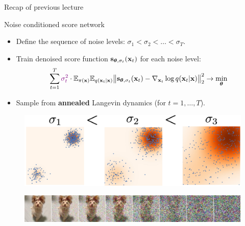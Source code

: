 \begin{frame}{Recap of previous lecture}
	\begin{block}{Noise conditioned score network}
		\begin{itemize}
			\item Define the sequence of noise levels: $\sigma_1 < \sigma_2 < \dots < \sigma_T$.
			\item Train denoised score function $\mathbf{s}_{\boldsymbol{\theta}, \sigma_t}(\mathbf{x}_t)$ for each noise level:
			\vspace{-0.3cm}
			\[
				\sum_{t=1}^T {\color{violet}\sigma_t^2} \cdot \mathbb{E}_{\pi(\mathbf{x})} \mathbb{E}_{q(\mathbf{x}_t | \mathbf{x})}\bigl\| \mathbf{s}_{\boldsymbol{\theta}, \sigma_t}(\mathbf{x}_t) - \nabla_{\mathbf{x}_t} \log q(\mathbf{x}_t | \mathbf{x}) \bigr\|^2_2 \rightarrow \min_{\boldsymbol{\theta}}
			\]
			\vspace{-0.5cm}
			\item Sample from \textbf{annealed} Langevin dynamics (for $t=1, \dots, T$).
		\end{itemize}
	\end{block}
	\begin{figure}
		\includegraphics[width=0.55\linewidth]{figs/multi_scale}
	\end{figure}
	\begin{figure}
		\includegraphics[width=\linewidth]{figs/duoduo}
	\end{figure}
\end{frame}
